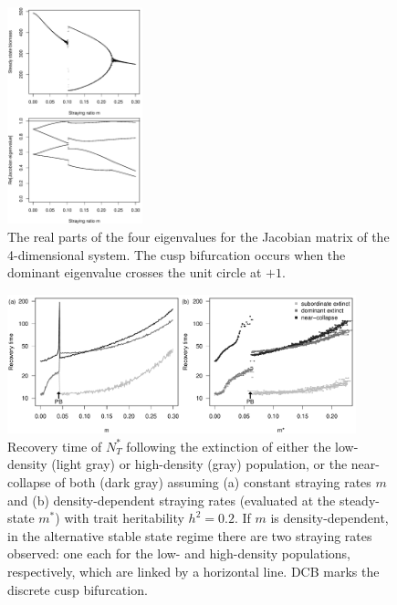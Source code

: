 \documentclass{revtex4}
\begin{document}
% 


\begin{figure}
  \captionsetup{justification=raggedright,
singlelinecheck=false
}
\centering
\includegraphics[width=0.35\textwidth]{fig_eigs.pdf}
\caption{
The real parts of the four eigenvalues for the Jacobian matrix of the 4-dimensional system.
The cusp bifurcation occurs when the dominant eigenvalue crosses the unit circle at $+1$. 
} \label{fig:eigs}
\end{figure}



\begin{figure}
  \captionsetup{justification=raggedright,
singlelinecheck=false
}
\centering
\includegraphics[width=0.9\textwidth]{fig_relax_lowh.pdf}
\caption{
Recovery time of $N_T^*$ following the extinction of either the low-density (light gray) or high-density (gray) population, or the near-collapse of both (dark gray) assuming (a) constant straying rates $m$ and (b) density-dependent straying rates (evaluated at the steady-state $m^*$) with trait heritability $h^2=0.2$.
If $m$ is density-dependent, in the alternative stable state regime there are two straying rates observed: one each for the low- and high-density populations, respectively, which are linked by a horizontal line.
DCB marks the discrete cusp bifurcation.
} \label{fig:relax}
\end{figure}
\end{document}
